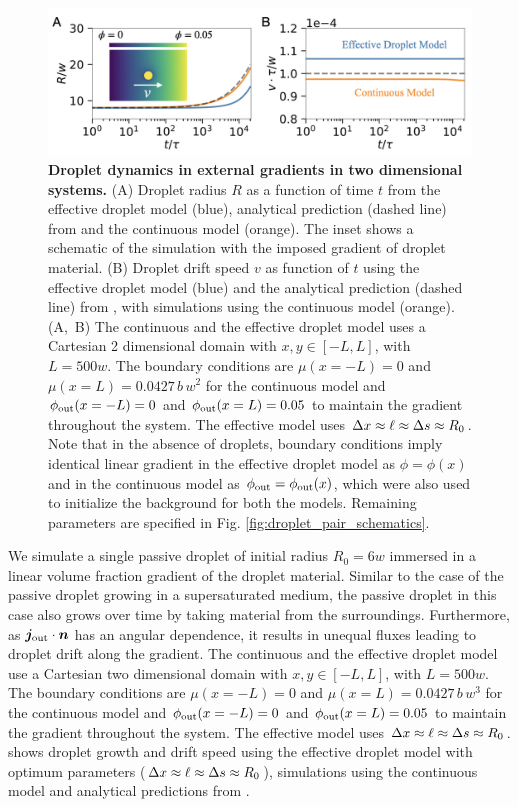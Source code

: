 \begin{appendices}
\begin{figure}[t]
\centering
\includegraphics[scale=0.5]{MainContent/Figures/Strong_Gradient_2D.pdf}
\caption{\textbf{Droplet dynamics in external gradients in two dimensional systems.}
(A) Droplet radius $R$ as a function of time $t$ from the effective droplet model (blue), analytical prediction (dashed line) from  and the continuous model (orange).
The inset shows a schematic of the simulation with the imposed gradient of droplet material.
(B) Droplet drift speed $v$ as function of $t$ using the effective droplet model (blue) and the analytical prediction (dashed line) from , with simulations using the continuous model (orange).
\mbox{(A, B)}
The continuous and the effective droplet model uses a Cartesian 2 dimensional domain with $x,y \in [-L, L]$, with $L=500 w$. The boundary conditions are $\mu(x=-L) = 0$ and $\mu(x=L)= 0.0427\,b\,w^2$ for the continuous model and $\phi_\mathrm{out}(x=-L) = 0$ and $\phi_\mathrm{out}(x=L)= 0.05$ to maintain the gradient throughout the system.
The effective model uses $\Delta x \approx \ell \approx \Delta s \approx R_0$.
Note that in the absence of droplets, boundary conditions imply identical linear gradient in the effective droplet model as $\phi=\phi(x)$ and in the continuous model as $\phi_\mathrm{out}=\phi_\mathrm{out}(x)$, which were also used to initialize the background for both the models.
Remaining parameters are specified in Fig. \ref{fig:droplet_pair_schematics}.
}
\label{fig:drop_in_gradient_2D}
\end{figure}

We simulate a single passive droplet of initial radius $R_0 = 6w$ immersed in a linear volume fraction gradient of the droplet material. 
Similar to the case of the passive droplet growing in a supersaturated medium, the passive droplet in this case also grows over time by taking material from the surroundings. 
Furthermore, as $\boldsymbol{j}_\mathrm{out} \cdot \boldsymbol{n}$ has an angular dependence, it results in unequal fluxes leading to droplet drift along the gradient.
The continuous and the effective droplet model use a Cartesian two dimensional domain with $x,y \in [-L, L]$, with $L=500 w$. 
The boundary conditions are $\mu(x=-L) = 0$ and $\mu(x=L)= 0.0427\,b\,w^3$ for the continuous model and $\phi_\mathrm{out}(x=-L) = 0$ and $\phi_\mathrm{out}(x=L)= 0.05$ to maintain the gradient throughout the system.
The effective model uses $\Delta x \approx \ell \approx \Delta s \approx R_0$.
 shows droplet growth and drift speed using the effective droplet model with optimum parameters ($\Delta x \approx \ell \approx \Delta s \approx R_0$), simulations using the continuous model and analytical predictions from .


\end{appendices}